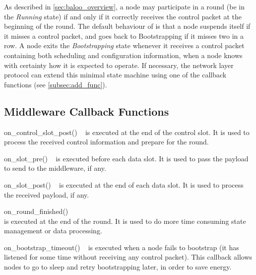 As described in \cref{sec:baloo_overview}, a node may participate in a round (\ie be in the \textsl{Running} state) if and only if it correctly receives the control packet at the beginning of the round.
%
The default behaviour of \baloo is that a node suspends itself if it misses a control packet, and goes back to Bootstrapping if it misses two in a row. A node exits the \textsl{Bootstrapping} state whenever it receives a control packet containing both scheduling and configuration information, \ie when a node knows with certainty how it is expected to operate.
%
If necessary, the network layer protocol can extend this minimal state machine using one of the callback functions (see \cref{subsec:add_func}).

\subsection{Middleware Callback Functions}
\label{subsec:CB}


\begin{functions}

	\item[on\_control\_slot\_post()]~\newline
	is executed at the end of the control slot.
	It is used to process the received control information and prepare for the round.

	\item[on\_slot\_pre()]~\newline
	is executed before each data slot.
	It is used to pass the payload to send to the middleware, if any.

	\item[on\_slot\_post()]~\newline
	is executed at the end of each data slot.
	It is used to process the received payload, if any.

	\item[on\_round\_finished()]~\\
	is executed at the end of the round.
	It is used to do more time consuming state management or data processing.

	\item[on\_bootstrap\_timeout()]~\newline
	is executed when a node fails to bootstrap (\ie it has listened for some time without receiving any control packet).
	This callback allows nodes to go to sleep and retry bootstrapping later, in order to save energy.

\end{functions}

